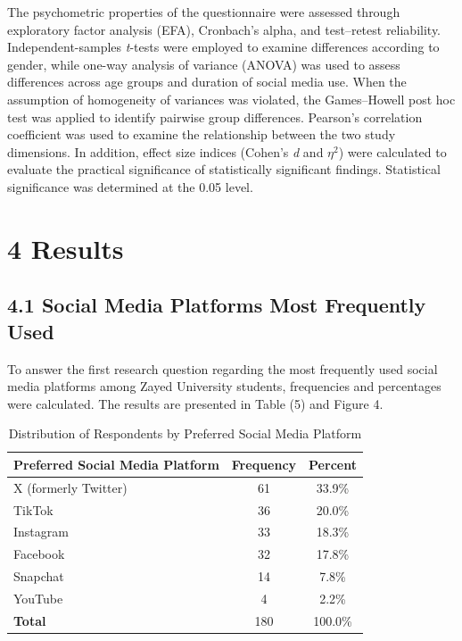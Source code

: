 \documentclass[10pt]{NSP1}
\begin{document}
	The psychometric properties of the questionnaire were assessed through exploratory factor analysis (EFA), Cronbach's alpha, and test–retest reliability. Independent-samples \textit{t}-tests were employed to examine differences according to gender, while one-way analysis of variance (ANOVA) was used to assess differences across age groups and duration of social media use. When the assumption of homogeneity of variances was violated, the Games–Howell post hoc test was applied to identify pairwise group differences. Pearson's correlation coefficient was used to examine the relationship between the two study dimensions. In addition, effect size indices (Cohen's \textit{d} and $\eta^{2}$) were calculated to evaluate the practical significance of statistically significant findings. Statistical significance was determined at the 0.05 level.
	
	\section*{4 Results}
	
	\subsection*{4.1 Social Media Platforms Most Frequently Used}
	
	To answer the first research question regarding the most frequently used social media platforms among Zayed University students, frequencies and percentages were calculated. The results are presented in Table (5) and Figure 4.
	
	\setcounter{table}{4}
	\begin{table}[H]
		\centering
		\caption{Distribution of Respondents by Preferred Social Media Platform}
		\small
		\renewcommand{\arraystretch}{1.3}
		\begin{tabular}{|l|c|c|}
			\hline
			\textbf{Preferred Social Media Platform} & \textbf{Frequency} & \textbf{Percent} \\
			\hline
			X (formerly Twitter) & 61 & 33.9\% \\
			TikTok & 36 & 20.0\% \\
			Instagram & 33 & 18.3\% \\
			Facebook & 32 & 17.8\% \\
			Snapchat & 14 & 7.8\% \\
			YouTube & 4 & 2.2\% \\
			\hline
			\textbf{Total} & 180 & 100.0\% \\
			\hline
		\end{tabular}
	\end{table}
	
\end{document}
